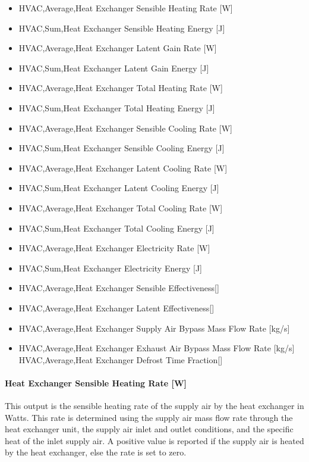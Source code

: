 \begin{itemize}
\item
  HVAC,Average,Heat Exchanger Sensible Heating Rate {[}W{]}
\item
  HVAC,Sum,Heat Exchanger Sensible Heating Energy {[}J{]}
\item
  HVAC,Average,Heat Exchanger Latent Gain Rate {[}W{]}
\item
  HVAC,Sum,Heat Exchanger Latent Gain Energy {[}J{]}
\item
  HVAC,Average,Heat Exchanger Total Heating Rate {[}W{]}
\item
  HVAC,Sum,Heat Exchanger Total Heating Energy {[}J{]}
\item
  HVAC,Average,Heat Exchanger Sensible Cooling Rate {[}W{]}
\item
  HVAC,Sum,Heat Exchanger Sensible Cooling Energy {[}J{]}
\item
  HVAC,Average,Heat Exchanger Latent Cooling Rate {[}W{]}
\item
  HVAC,Sum,Heat Exchanger Latent Cooling Energy {[}J{]}
\item
  HVAC,Average,Heat Exchanger Total Cooling Rate {[}W{]}
\item
  HVAC,Sum,Heat Exchanger Total Cooling Energy {[}J{]}
\item
  HVAC,Average,Heat Exchanger Electricity Rate {[}W{]}
\item
  HVAC,Sum,Heat Exchanger Electricity Energy {[}J{]}
\item
  HVAC,Average,Heat Exchanger Sensible Effectiveness{[]}
\item
  HVAC,Average,Heat Exchanger Latent Effectiveness{[]}
\item
  HVAC,Average,Heat Exchanger Supply Air Bypass Mass Flow Rate {[}kg/s{]}
\item
  HVAC,Average,Heat Exchanger Exhaust Air Bypass Mass Flow Rate {[}kg/s{]} HVAC,Average,Heat Exchanger Defrost Time Fraction{[]}
\end{itemize}

\paragraph{Heat Exchanger Sensible Heating Rate {[}W{]}}\label{heat-exchanger-sensible-heating-rate-w-1}

This output is the sensible heating rate of the supply air by the heat exchanger in Watts. This rate is determined using the supply air mass flow rate through the heat exchanger unit, the supply air inlet and outlet conditions, and the specific heat of the inlet supply air. A positive value is reported if the supply air is heated by the heat exchanger, else the rate is set to zero.

